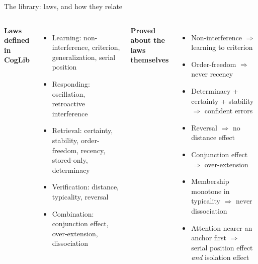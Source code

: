 \documentclass[aspectratio=169,11pt]{beamer}
\begin{document}

\begin{frame}{The library: laws, and how they relate}
  \small
  \begin{columns}[T]
    \textbf{Laws defined in CogLib}
    \begin{itemize}
      \item Learning: non-interference, criterion, generalization, serial position
      \item Responding: oscillation, retroactive interference
      \item Retrieval: certainty, stability, order-freedom, recency, stored-only, determinacy
      \item Verification: distance, typicality, reversal
      \item Combination: conjunction effect, over-extension, dissociation
    \end{itemize}
    \textbf{Proved about the laws themselves}
    \begin{itemize}
      \item Non-interference $\Rightarrow$ learning to criterion
      \item Order-freedom $\Rightarrow$ never recency
      \item Determinacy + certainty + stability $\Rightarrow$ confident errors
      \item Reversal $\Rightarrow$ no distance effect
      \item Conjunction effect $\Rightarrow$ over-extension
      \item Membership monotone in typicality $\Rightarrow$ never dissociation
      \item Attention nearer an anchor first $\Rightarrow$ serial position effect \emph{and} isolation effect
    \end{itemize}
  \end{columns}
\end{frame}
\end{document}

